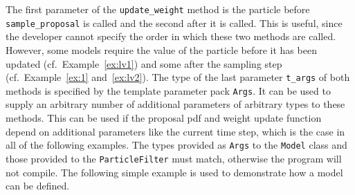 The first parameter of the \texttt{update\_weight} method is the
particle before \texttt{sample\_proposal} is called and the second
after it is called. This is useful, since the developer cannot specify
the order in which these two methods are called. However, some models
require the value of the particle before it has been updated (cf.\
Example~\ref{ex:lv1}) and some after the sampling step (cf.\
Example~\ref{ex:1} and~\ref{ex:lv2}). The type of the last parameter
\texttt{t\_args} of both methods is specified by the template
parameter pack \texttt{Args}. It can be used to supply an arbitrary
number of additional parameters of arbitrary types to these methods.
This can be used if the proposal pdf and weight update function depend
on additional parameters like the current time step, which is the case
in all of the following examples. The types provided as \texttt{Args}
to the \texttt{Model} class and those provided to the
\texttt{ParticleFilter} must match, otherwise the program will not
compile. The following simple example is used to demonstrate how a
model can be defined.

